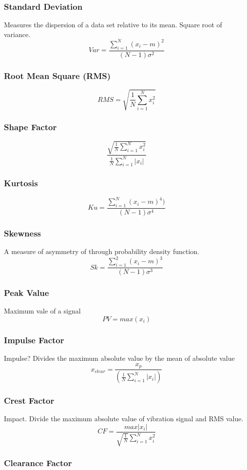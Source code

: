 \documentclass{article}
\begin{document}
\subsubsection{Standard Deviation}  
Measures the dispersion of a data set relative to its mean. Square root of variance.
$$ Var =\frac{\sum^N_{i=1}(x_i-m)^2}{(N-1)\sigma^2} $$
\subsubsection{Root Mean Square (RMS)}

$$ RMS = \sqrt{\frac{1}{N} \sum^N_{i=1}x^2_i} $$
\subsubsection{Shape Factor}

$$ \frac{ \sqrt{\frac{1}{N} \sum^N_{i=1}x_i^2} }  {\frac{1}{N}\sum^N_{i=1}|x_i|} $$
\subsubsection{Kurtosis}

$$ Ku = \frac{\sum^N_{i=1}(x_i-m)^4)}{(N-1)\sigma^4} $$ 
\subsubsection{Skewness} 
A measure of asymmetry of through probability density function.
$$ Sk = \frac{\sum^2_{i=1}(x_i-m)^3}{(N-1)\sigma^3} $$
\subsubsection{Peak Value}
Maximum vale of a signal
$$ PV = max(x_i) $$ 
\subsubsection{Impulse Factor} 
Impulse? Divides the maximum absolute value by the mean of absolute value
$$ x_{clear} = \frac{x_p}{(\frac{1}{N}\sum^N_{i=1}|x_i|)} $$  
\subsubsection{Crest Factor} 
Impact. Divide the maximum absolute value of vibration signal and
RMS value.
$$ CF = \frac{max|x_i|}{\sqrt{\frac{1}{N}}\sum^N_{i=1}x^2_i} $$
\subsubsection{Clearance Factor} 
\end{document}
